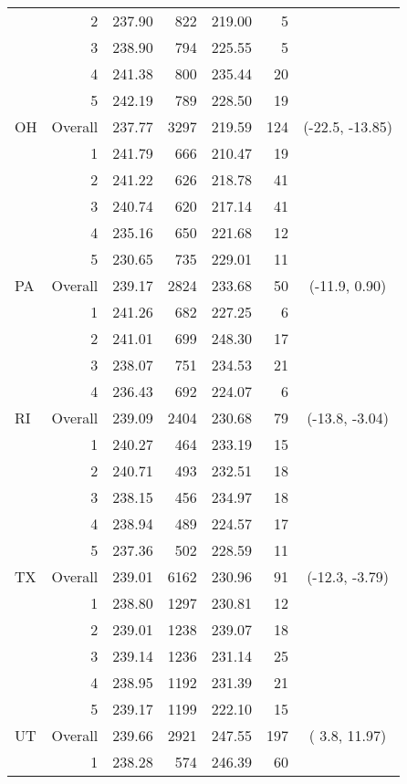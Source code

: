 \begin{longtable}{lrrr@{\extracolsep{.25cm}}rrc}
   & 2 & 237.90 & 822 & 219.00 &   5 &  \\ 
   & 3 & 238.90 & 794 & 225.55 &   5 &  \\ 
   & 4 & 241.38 & 800 & 235.44 &  20 &  \\ 
   & 5 & 242.19 & 789 & 228.50 &  19 &  \\ 
   \hline
OH & Overall & 237.77 & 3297 & 219.59 & 124 & (-22.5, -13.85) \\ 
   & 1 & 241.79 & 666 & 210.47 &  19 &  \\ 
   & 2 & 241.22 & 626 & 218.78 &  41 &  \\ 
   & 3 & 240.74 & 620 & 217.14 &  41 &  \\ 
   & 4 & 235.16 & 650 & 221.68 &  12 &  \\ 
   & 5 & 230.65 & 735 & 229.01 &  11 &  \\ 
   \hline
PA & Overall & 239.17 & 2824 & 233.68 &  50 & (-11.9,   0.90) \\ 
   & 1 & 241.26 & 682 & 227.25 &   6 &  \\ 
   & 2 & 241.01 & 699 & 248.30 &  17 &  \\ 
   & 3 & 238.07 & 751 & 234.53 &  21 &  \\ 
   & 4 & 236.43 & 692 & 224.07 &   6 &  \\ 
   \hline
RI & Overall & 239.09 & 2404 & 230.68 &  79 & (-13.8,  -3.04) \\ 
   & 1 & 240.27 & 464 & 233.19 &  15 &  \\ 
   & 2 & 240.71 & 493 & 232.51 &  18 &  \\ 
   & 3 & 238.15 & 456 & 234.97 &  18 &  \\ 
   & 4 & 238.94 & 489 & 224.57 &  17 &  \\ 
   & 5 & 237.36 & 502 & 228.59 &  11 &  \\ 
   \hline
TX & Overall & 239.01 & 6162 & 230.96 &  91 & (-12.3,  -3.79) \\ 
   & 1 & 238.80 & 1297 & 230.81 &  12 &  \\ 
   & 2 & 239.01 & 1238 & 239.07 &  18 &  \\ 
   & 3 & 239.14 & 1236 & 231.14 &  25 &  \\ 
   & 4 & 238.95 & 1192 & 231.39 &  21 &  \\ 
   & 5 & 239.17 & 1199 & 222.10 &  15 &  \\ 
   \hline
UT & Overall & 239.66 & 2921 & 247.55 & 197 & (  3.8,  11.97) \\ 
   & 1 & 238.28 & 574 & 246.39 &  60 &  \\ 

\end{longtable}
